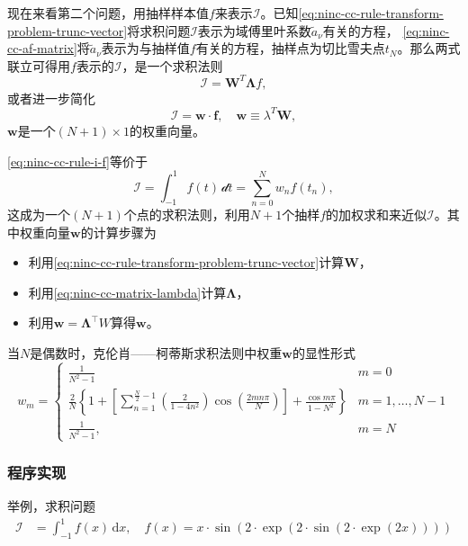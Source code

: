 现在来看第二个问题，用抽样样本值$f$来表示$\mathcal{I}$。已知\eqref{eq:ninc-cc-rule-transform-problem-trunc-vector}将求积问题$\mathcal{I}$表示为域傅里叶系数$\tilde{a}_{\nu}$有关的方程，
\eqref{eq:ninc-cc-af-matrix}将$\tilde{a}_{\nu}$表示为与抽样值$f$有关的方程，抽样点为切比雪夫点$t_{N}$。那么两式联立可得用$f$表示的$\mathcal{I}$，是一个求积法则
\begin{equation*}
  \mathcal{I} = \bm{W}^{T} \bm{\Lambda} f,
\end{equation*}
或者进一步简化
\begin{equation}
  \label{eq:ninc-cc-rule-i-f}
  \mathcal{I} = \bm{w} \cdot \bm{f}, \quad \bm{w} \equiv \lambda^{T} \bm{W},
\end{equation}
$\bm{w}$是一个$\left( N + 1 \right) \times 1$的权重向量。

\eqref{eq:ninc-cc-rule-i-f}等价于
\begin{equation}
  \label{eq:ninc-cc-rule-i-f-extend}
  \mathcal{I} = \int_{-1}^{1} f(t) \, \mathcal{d}t = \sum_{n=0}^{N} w_{n} f \left( t_{n} \right),
\end{equation}
这成为一个$(N+1)$个点的求积法则，利用$N+1$个抽样$f$的加权求和来近似$\mathcal{I}$。其中权重向量$\bm{w}$的计算步骤为
\begin{itemize}
  \item 利用\eqref{eq:ninc-cc-rule-transform-problem-trunc-vector}计算$\bm{W}$，
  \item 利用\eqref{eq:ninc-cc-matrix-lambda}计算$\bm{\Lambda}$，
  \item 利用$\bm{w} = \bm{\Lambda}^{\top} W$算得$\bm{w}$。
\end{itemize}

当$N$是偶数时，克伦肖——柯蒂斯求积法则中权重$\bm{w}$的显性形式
\begin{equation}
  w_{m} = \begin{cases}
  \frac{1}{N^{2} -1} & m=0 \\
  \frac{2}{N} \left\{
  1 +
  \left[
  \sum_{n=1}^{\frac{N}{2} - 1} \left( \frac{2}{1 - 4 n^{2}} \right)
  \cos \left( \frac{2 m n \pi }{N} \right)
  \right]
  + \frac{\cos m \pi}{1 - N^{2}}
  \right\} & m = 1,\ldots,N-1 \\
  \frac{1}{N^{2} - 1}, & m = N
  \end{cases}
\end{equation}

\subsubsection{程序实现}
举例，求积问题
\begin{equation*}
\begin{split}
    \mathcal{I} & = \int_{-1}^{1} f(x) \, \mathrm{d} x, \quad  f(x) = x \cdot \sin \left(
    2 \cdot \exp \left( 2 \cdot \sin
    \left( 2 \cdot \exp \left( 2 x \right)\right)
    \right)
    \right)
\end{split}
\end{equation*}

